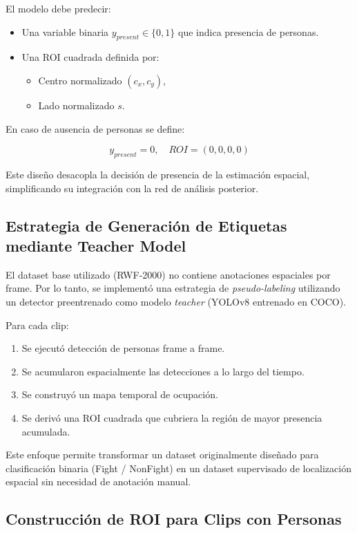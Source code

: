 \documentclass[12pt,a4paper]{article}
\begin{document}
El modelo debe predecir:

\begin{itemize}
    \item Una variable binaria $y_{present} \in \{0,1\}$ que indica presencia de personas.
    \item Una ROI cuadrada definida por:
    \begin{itemize}
        \item Centro normalizado $(c_x, c_y)$,
        \item Lado normalizado $s$.
    \end{itemize}
\end{itemize}

En caso de ausencia de personas se define:

\[
y_{present} = 0, \quad ROI = (0,0,0,0)
\]

Este diseño desacopla la decisión de presencia de la estimación espacial, simplificando su integración con la red de análisis posterior.

\subsection{Estrategia de Generación de Etiquetas mediante Teacher Model}

El dataset base utilizado (RWF-2000) no contiene anotaciones espaciales por frame. Por lo tanto, se implementó una estrategia de \textit{pseudo-labeling} utilizando un detector preentrenado como modelo \textit{teacher} (YOLOv8 entrenado en COCO).

Para cada clip:

\begin{enumerate}
    \item Se ejecutó detección de personas frame a frame.
    \item Se acumularon espacialmente las detecciones a lo largo del tiempo.
    \item Se construyó un mapa temporal de ocupación.
    \item Se derivó una ROI cuadrada que cubriera la región de mayor presencia acumulada.
\end{enumerate}

Este enfoque permite transformar un dataset originalmente diseñado para clasificación binaria (Fight / NonFight) en un dataset supervisado de localización espacial sin necesidad de anotación manual.

\subsection{Construcción de ROI para Clips con Personas}
\end{document}
